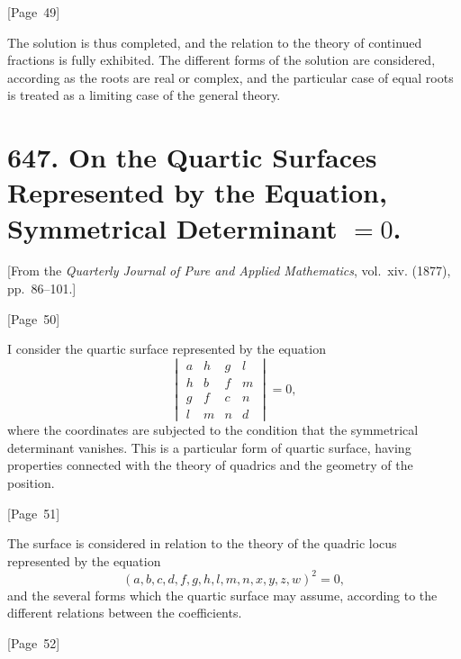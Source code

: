 \documentclass[11pt,a4paper]{book}
\providecommand{\between}{,}
\begin{document}
\begin{center}
[Page~49]
\end{center}

The solution is thus completed, and the relation to the theory of
continued fractions is fully exhibited. The different forms of the
solution are considered, according as the roots are real or complex,
and the particular case of equal roots is treated as a limiting case
of the general theory.


\newpage
\section*{647. On the Quartic Surfaces Represented by the Equation, Symmetrical Determinant $=0$.}

[From the \textit{Quarterly Journal of Pure and Applied Mathematics},
vol.~xiv. (1877), pp.~86--101.]

\begin{center}
[Page~50]
\end{center}

I consider the quartic surface represented by the equation
\[
\begin{vmatrix}
a & h & g & l \\
h & b & f & m \\
g & f & c & n \\
l & m & n & d
\end{vmatrix} = 0,
\]
where the coordinates are subjected to the condition that the
symmetrical determinant vanishes. This is a particular form of quartic
surface, having properties connected with the theory of quadrics and
the geometry of the position.

\begin{center}
[Page~51]
\end{center}

The surface is considered in relation to the theory of the quadric
locus represented by the equation
\[
(a,b,c,d,f,g,h,l,m,n\between x,y,z,w)^2 = 0,
\]
and the several forms which the quartic surface may assume, according
to the different relations between the coefficients.

\begin{center}
[Page~52]
\end{center}
\end{document}
